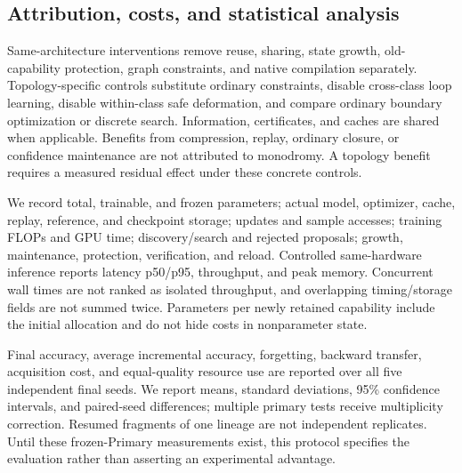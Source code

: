 \subsection{Attribution, costs, and statistical analysis}

Same-architecture interventions remove reuse, sharing, state growth,
old-capability protection, graph constraints, and native compilation separately.
Topology-specific controls substitute ordinary constraints, disable cross-class
loop learning, disable within-class safe deformation, and compare ordinary
boundary optimization or discrete search. Information, certificates, and caches
are shared when applicable. Benefits from compression, replay, ordinary closure,
or confidence maintenance are not attributed to monodromy. A topology benefit
requires a measured residual effect under these concrete controls.

We record total, trainable, and frozen parameters; actual model, optimizer,
cache, replay, reference, and checkpoint storage; updates and sample accesses;
training FLOPs and GPU time; discovery/search and rejected proposals; growth,
maintenance, protection, verification, and reload. Controlled same-hardware
inference reports latency p50/p95, throughput, and peak memory. Concurrent wall
times are not ranked as isolated throughput, and overlapping timing/storage
fields are not summed twice. Parameters per newly retained capability include
the initial allocation and do not hide costs in nonparameter state.

Final accuracy, average incremental accuracy, forgetting, backward transfer,
acquisition cost, and equal-quality resource use are reported over all five
independent final seeds. We report means, standard deviations, 95\% confidence
intervals, and paired-seed differences; multiple primary tests receive
multiplicity correction. Resumed fragments of one lineage are not independent
replicates. Until these frozen-Primary measurements exist, this protocol
specifies the evaluation rather than asserting an experimental advantage.

